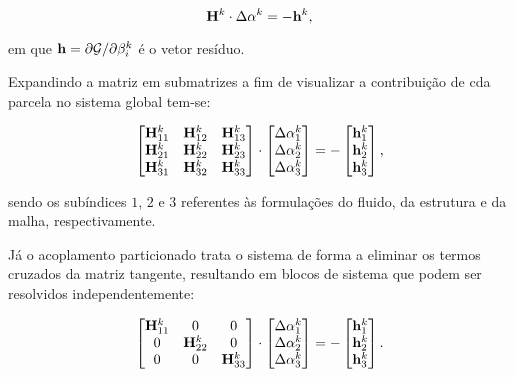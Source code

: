 \begin{equation}
    \mathbf{H}^k\cdot\Delta\mathbf{\alpha}^k=-\mathbf{h}^k\text{,}
\end{equation}

\noindent em que $\mathbf{h}=\partial\mathcal{G}/\partial\beta_i^k$ é o vetor resíduo.

Expandindo a matriz em submatrizes a fim de visualizar a contribuição de cda parcela no sistema global tem-se:

\begin{equation}
    \begin{bmatrix}
        \mathbf{H}_{11}^k & \mathbf{H}_{12}^k & \mathbf{H}_{13}^k \\
        \mathbf{H}_{21}^k & \mathbf{H}_{22}^k & \mathbf{H}_{23}^k \\
        \mathbf{H}_{31}^k & \mathbf{H}_{32}^k & \mathbf{H}_{33}^k
    \end{bmatrix}\cdot\begin{bmatrix}
        \Delta\mathbf{\alpha}_1^k \\\Delta\mathbf{\alpha}_2^k\\\Delta\mathbf{\alpha}_3^k
    \end{bmatrix}=-\begin{bmatrix}
        \mathbf{h}_1^k \\\mathbf{h}_2^k\\\mathbf{h}_3^k
    \end{bmatrix}\text{,}
\end{equation}

\noindent sendo os subíndices $1$, $2$ e $3$ referentes às formulações do fluido, da estrutura e da malha, respectivamente.

Já o acoplamento particionado trata o sistema de forma a eliminar os termos cruzados da matriz tangente, resultando em blocos de sistema que podem ser resolvidos independentemente:

\begin{equation}
    \begin{bmatrix}
        \mathbf{H}_{11}^k & 0             & 0             \\
        0             & \mathbf{H}_{22}^k & 0             \\
        0             & 0             & \mathbf{H}_{33}^k
    \end{bmatrix}\cdot\begin{bmatrix}
        \Delta\mathbf{\alpha}_1^k \\\Delta\mathbf{\alpha}_2^k\\\Delta\mathbf{\alpha}_3^k
    \end{bmatrix}=-\begin{bmatrix}
        \mathbf{h}_1^k \\\mathbf{h}_2^k\\\mathbf{h}_3^k
    \end{bmatrix}\text{.}
\end{equation}

